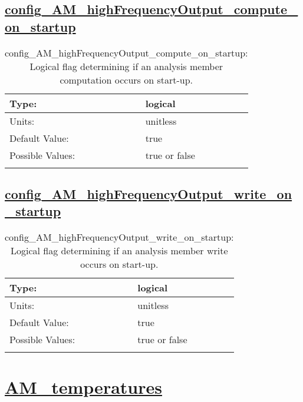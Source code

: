 \subsection[config\_AM\_highFrequencyOutput\_compute\_on\_startup]{\hyperref[sec:nm_tab_AM_highFrequencyOutput]{config\_AM\_highFrequencyOutput\_compute\_on\_startup}}
\label{subsec:nm_sec_config_AM_highFrequencyOutput_compute_on_startup}
\begin{center}
\begin{longtable}{| p{2.0in} || p{4.0in} |}
    \hline
    Type: & logical \\
    \hline
    Units: & \si{unitless} \\
    \hline
    Default Value: & true \\
    \hline
    Possible Values: & true or false \\
    \hline
    \caption{config\_AM\_highFrequencyOutput\_compute\_on\_startup: Logical flag determining if an analysis member computation occurs on start-up.}
\end{longtable}
\end{center}
\subsection[config\_AM\_highFrequencyOutput\_write\_on\_startup]{\hyperref[sec:nm_tab_AM_highFrequencyOutput]{config\_AM\_highFrequencyOutput\_write\_on\_startup}}
\label{subsec:nm_sec_config_AM_highFrequencyOutput_write_on_startup}
\begin{center}
\begin{longtable}{| p{2.0in} || p{4.0in} |}
    \hline
    Type: & logical \\
    \hline
    Units: & \si{unitless} \\
    \hline
    Default Value: & true \\
    \hline
    Possible Values: & true or false \\
    \hline
    \caption{config\_AM\_highFrequencyOutput\_write\_on\_startup: Logical flag determining if an analysis member write occurs on start-up.}
\end{longtable}
\end{center}
\section[AM\_temperatures]{\hyperref[sec:nm_tab_AM_temperatures]{AM\_temperatures}}
\label{sec:nm_sec_AM_temperatures}
